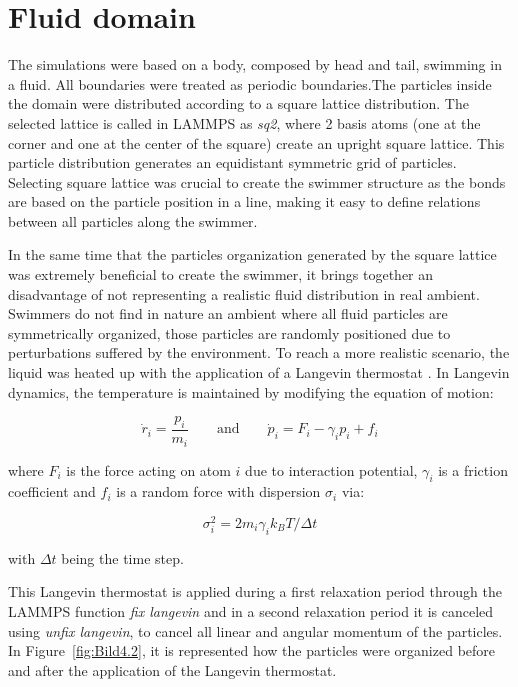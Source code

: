 \section{Fluid domain}
\label{sec:section 2}

The simulations were based on a body, composed by head and tail, swimming in a fluid. All boundaries were treated as periodic boundaries.The particles inside the domain were distributed according to a square lattice distribution. The selected lattice is
called in LAMMPS as \textit{sq2}, where 2 basis atoms (one at the corner and one at the center of the square) create an upright square lattice. This particle distribution 
generates an equidistant symmetric grid of particles. Selecting square lattice was crucial to create the swimmer structure as the bonds are based on the particle position in a line, 
making it easy to define relations between all particles along the swimmer.\par
In the same time that the particles organization generated by the square lattice was extremely beneficial to create the swimmer, it brings together an disadvantage of not representing
a realistic fluid distribution in real ambient. Swimmers do not find in nature an ambient where all fluid particles are symmetrically organized, those particles are randomly 
positioned due to perturbations suffered by the environment. To reach a more realistic scenario, the liquid was heated up with the application of a Langevin thermostat \cite{schneider_molecular-dynamics_1978}.
In Langevin dynamics, the temperature is maintained by modifying the equation of motion:

\begin{equation}
\dot{r}_{i} = \frac{p_{i}}{m_{i}} \quad \quad \text{and} \quad \quad \dot{p}_{i}= F_{i} - \gamma_{i} p_{i} + f_{i}
\end{equation}

where $F_{i}$ is the force acting on atom $i$ due to interaction potential, $\gamma_{i}$ is a friction coefficient and $f_{i}$ is a random force with dispersion $\sigma_{i}$ via:


\begin{equation}
\sigma_{i}^2 = 2 m_{i} \gamma_{i} k_{B} T / \Delta t
\end{equation}

with $\Delta t$ being the time step.\par

This Langevin thermostat is applied during a first relaxation period through the LAMMPS function \textit{fix langevin} and in a second relaxation period it is canceled using
\textit{unfix langevin}, to cancel all linear and angular momentum of the particles. In Figure~\ref{fig:Bild4.2}, it is represented how the particles were organized before and after the
application of the Langevin thermostat.



